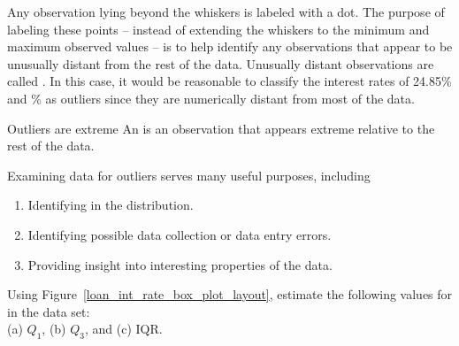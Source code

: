 Any observation lying beyond the whiskers is labeled with a dot.
The purpose of labeling these points --
instead of extending the whiskers to the minimum
and maximum observed values --
is to help identify any observations that appear to be
unusually distant from the rest of the data.
Unusually distant observations are called
.
In this case, it would be reasonable to classify the
interest rates of 24.85\% and \loanLargestValue{}\%
as outliers since they are numerically distant from
most of the data.

\begin{onebox}{Outliers are extreme}
  An  is an observation that appears
  extreme relative to the rest of the data. \vspace{3mm}
  
  Examining data for outliers serves
  many useful purposes, including\vspace{-1mm}
  \begin{enumerate}
  \setlength{\itemsep}{0mm}
  \item Identifying
      in the distribution.
  \item Identifying possible data collection or
      data entry errors.
  \item Providing insight into interesting properties
      of the data.\vspace{-1mm}
  \end{enumerate}
\end{onebox}


\begin{exercisewrap}
\begin{nexercise}
Using Figure~\ref{loan_int_rate_box_plot_layout},
estimate the following values for
 in the  data set: \\
(a) $Q_1$,
(b) $Q_3$, and
(c) IQR.\footnotemark{}
\end{nexercise}
\end{exercisewrap}

